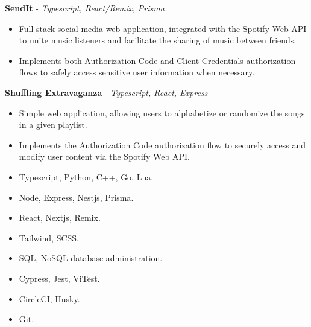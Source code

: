 \documentclass[12pt]{article}
\begin{document}
\vspace{-8mm}


\begin{flushleft}

  \hrulefill {} \quad \hrulefill

  \vspace{2mm}
   
  {\textbf{SendIt}} - \textit{Typescript, React/Remix, Prisma}

  \vspace{-3mm}
      
  \begin{itemize} \setlength\itemsep{-0.3em}
    \item Full-stack social media web application, integrated with the Spotify Web API to unite music listeners and facilitate the sharing of music between friends.
    \item Implements both Authorization Code and Client Credentials authorization flows to safely access sensitive user information when necessary.
  \end{itemize}

  {\textbf{Shuffling Extravaganza}} - \textit{Typescript, React, Express}

  \vspace{-3mm}
      
  \begin{itemize} \setlength\itemsep{-0.3em}
    \item Simple web application, allowing users to alphabetize or randomize the songs in a given playlist.
    \item Implements the Authorization Code authorization flow to securely access and modify user content via the Spotify Web API.
  \end{itemize}

\end{flushleft}


\begin{flushleft}
  \hrulefill {} \quad \hrulefill
  {\vspace{-1mm}}
  \begin{multicols}{2}
    \begin{itemize} \setlength\itemsep{-0.3em}\setlength\columnseprule{10pt}
      \item {Typescript, Python, C++, Go, Lua}.
      \item {Node, Express, Nestjs, Prisma}.
      \item {React, Nextjs, Remix}.
      \item {Tailwind, SCSS}. 
      \item {SQL, NoSQL database administration}.
      \item {Cypress, Jest, ViTest}.
      \item {CircleCI, Husky}.
      \item {Git}.
    \end{itemize}  
  \end{multicols}
\end{flushleft} 
\end{document}
